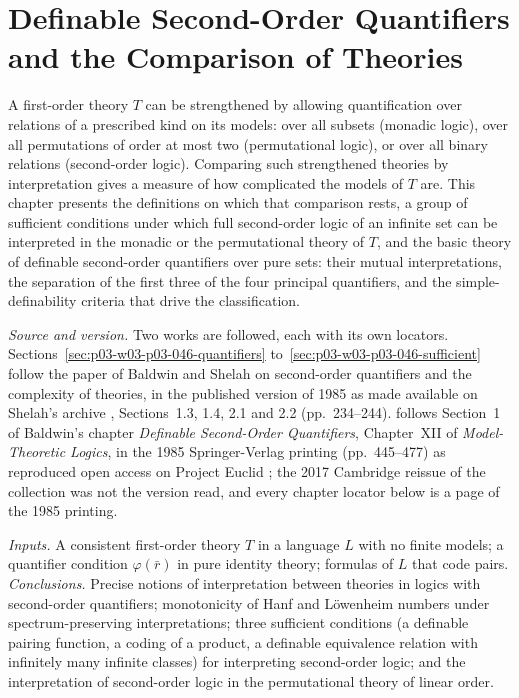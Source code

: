 \chapter{Definable Second-Order Quantifiers and the Comparison of Theories}
\label{sec:p03-w03-p03-046-dsoq}

A first-order theory \(T\) can be strengthened by allowing quantification
over relations of a prescribed kind on its models: over all subsets
(monadic logic), over all permutations of order at most two
(permutational logic), or over all binary relations (second-order logic).
Comparing such strengthened theories by interpretation gives a measure of
how complicated the models of \(T\) are. This chapter presents the
definitions on which that comparison rests, a group of sufficient
conditions under which full second-order logic of an infinite set can be
interpreted in the monadic or the permutational theory of \(T\), and the
basic theory of definable second-order quantifiers over pure sets: their
mutual interpretations, the separation of the first three of the four
principal quantifiers, and the simple-definability criteria that drive the
classification.

\emph{Source and version.} Two works are followed, each with its own
locators. Sections~\ref{sec:p03-w03-p03-046-quantifiers}
to~\ref{sec:p03-w03-p03-046-sufficient} follow the paper of Baldwin and
Shelah on second-order quantifiers and the complexity of theories, in the
published version of 1985 as made available on Shelah's archive
\cite{BaldwinShelah1985}, Sections~1.3, 1.4, 2.1 and 2.2 (pp.~234--244).
 follows Section~1 of Baldwin's chapter
\emph{Definable Second-Order Quantifiers}, Chapter~XII of
\emph{Model-Theoretic Logics}, in the 1985 Springer-Verlag printing
(pp.~445--477) as reproduced open access on Project Euclid
\cite{Baldwin1985DSOQ}; the 2017 Cambridge reissue of the collection
\cite{BarwiseFeferman1985} was not the version read, and every chapter
locator below is a page of the 1985 printing.

\emph{Inputs.} A consistent first-order theory \(T\) in a language \(L\)
with no finite models; a quantifier condition \(\varphi(\bar r)\) in pure
identity theory; formulas of \(L\) that code pairs.
\emph{Conclusions.} Precise notions of interpretation between theories in
logics with second-order quantifiers; monotonicity of Hanf and
L\"owenheim numbers under spectrum-preserving interpretations; three
sufficient conditions (a definable pairing function, a coding of a
product, a definable equivalence relation with infinitely many infinite
classes) for interpreting second-order logic; and the interpretation of
second-order logic in the permutational theory of linear order.

